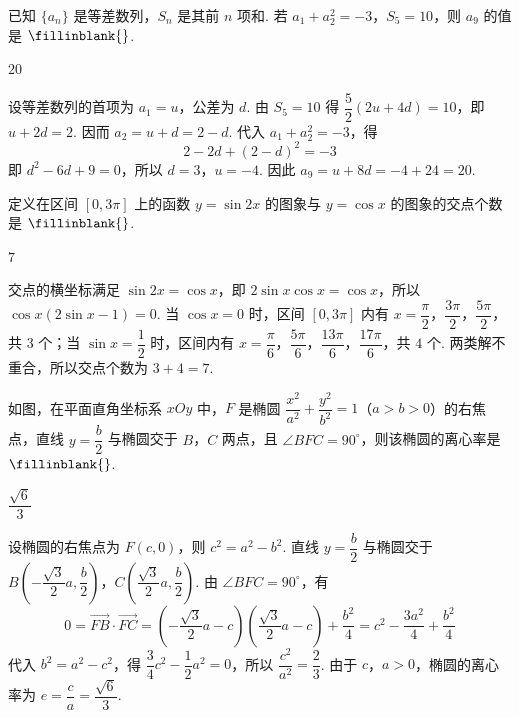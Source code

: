 \begin{problem}
已知 \(\{a_n\}\) 是等差数列，\(S_n\) 是其前 \(n\) 项和. 若 \(a_1+a_2^2=-3\)，\(S_5=10\)，则 \(a_9\) 的值是 \(\fillinblank{}\).
\end{problem}

\begin{answer}
\(20\)
\end{answer}

\begin{solution}
设等差数列的首项为 \(a_1=u\)，公差为 \(d\). 由 \(S_5=10\) 得 \(\dfrac{5}{2}(2u+4d)=10\)，即 \(u+2d=2\). 因而 \(a_2=u+d=2-d\). 代入 \(a_1+a_2^2=-3\)，得
\[
2-2d+(2-d)^2=-3
\]
即 \(d^2-6d+9=0\)，所以 \(d=3\)，\(u=-4\). 因此 \(a_9=u+8d=-4+24=20\).
\end{solution}

\begin{problem}
定义在区间 \([0,3\pi]\) 上的函数 \(y=\sin 2x\) 的图象与 \(y=\cos x\) 的图象的交点个数是 \(\fillinblank{}\).
\end{problem}

\begin{answer}
\(7\)
\end{answer}

\begin{solution}
交点的横坐标满足 \(\sin 2x=\cos x\)，即 \(2\sin x\cos x=\cos x\)，所以 \(\cos x(2\sin x-1)=0\). 当 \(\cos x=0\) 时，区间 \([0,3\pi]\) 内有 \(x=\dfrac{\pi}{2}\)，\(\dfrac{3\pi}{2}\)，\(\dfrac{5\pi}{2}\)，共 \(3\) 个；当 \(\sin x=\dfrac12\) 时，区间内有 \(x=\dfrac{\pi}{6}\)，\(\dfrac{5\pi}{6}\)，\(\dfrac{13\pi}{6}\)，\(\dfrac{17\pi}{6}\)，共 \(4\) 个. 两类解不重合，所以交点个数为 \(3+4=7\).
\end{solution}

\begin{problem}
如图，在平面直角坐标系 \(xOy\) 中，\(F\) 是椭圆 \(\dfrac{x^2}{a^2}+\dfrac{y^2}{b^2}=1\)（\(a>b>0\)）的右焦点，直线 \(y=\dfrac b2\) 与椭圆交于 \(B\)，\(C\) 两点，且 \(\angle BFC=90^\circ\)，则该椭圆的离心率是 \(\fillinblank{}\).
\end{problem}

\begin{answer}
\(\dfrac{\sqrt6}{3}\)
\end{answer}

\begin{solution}
设椭圆的右焦点为 \(F(c,0)\)，则 \(c^2=a^2-b^2\). 直线 \(y=\dfrac b2\) 与椭圆交于
\(B\left(-\dfrac{\sqrt3}{2}a,\dfrac b2\right)\)，\(C\left(\dfrac{\sqrt3}{2}a,\dfrac b2\right)\).
由 \(\angle BFC=90^\circ\)，有
\[
0=\overrightarrow{FB}\cdot\overrightarrow{FC}
=\left(-\dfrac{\sqrt3}{2}a-c\right)\left(\dfrac{\sqrt3}{2}a-c\right)+\dfrac{b^2}{4}
=c^2-\dfrac{3a^2}{4}+\dfrac{b^2}{4}
\]
代入 \(b^2=a^2-c^2\)，得 \(\dfrac34c^2-\dfrac12a^2=0\)，所以 \(\dfrac{c^2}{a^2}=\dfrac23\). 由于 \(c\)，\(a>0\)，椭圆的离心率为 \(e=\dfrac ca=\dfrac{\sqrt6}{3}\).
\end{solution}

